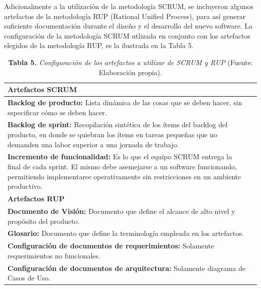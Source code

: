 Adicionalmente a la utilizaci\'{o}n de la metodolog\'{i}a SCRUM, se incluyeron algunos
artefactos de la metodolog\'{i}a RUP (Rational Unified Process), para as\'{i} generar suficiente documentaci\'{o}n durante el dise\~{n}o y el desarrollo del nuevo software. La configuraci\'{o}n
 de la metodolog\'{i}a SCRUM utlizada en conjunto con los artefactos elegidos de la
 metodolog\'{i}a RUP, es la ilustrada en la Tabla 5.

			\begin{table}[htb]
				\small
				\centering
				\setlength{\extrarowheight}{5pt}
			\begin{tabulary}{15cm}{|L|L|}
				\hline
				\textbf{Artefactos SCRUM}\\ \hline
				\textbf{Backlog de producto: }Lista din\'{a}mica de las cosas que se deben hacer, sin especificar c\'{o}mo se deben hacer.\\ \hline
				\textbf{Backlog de sprint: }Recopilaci\'{o}n sint\'{e}tica de los \'{i}tems del backlog del producto, en donde se quiebran los \'{i}tems en tareas peque\~{n}as que no demanden una labor superior a una jornada de trabajo.\\ \hline
				\textbf{Incremento de funcionalidad: }Es lo que el equipo SCRUM entrega la final de cada sprint. El mismo debe asemejarse a un software funcionando, permitiendo implementarse operativamente sin restricciones en un ambiente productivo.\\ \hline
				\textbf{Artefactos RUP}\\ \hline
				\textbf{Documento de Visi\'{o}n: }Documento que define el alcance de alto nivel y prop\'{o}sito del producto.\\
\hline
				\textbf{Glosario: }Documento que define la terminolog\'{i}a empleada en los artefactos.\\ \hline
				\textbf{Configuraci\'{o}n de documentos de requerimientos:} Solamente requerimientos no funcionales.\\ \hline
		\textbf{Configuraci\'{o}n de documentos de arquitectura: } Solamente diagrama de Casos de Uso.\\ \hline
			\end{tabulary}
	\caption{\textbf{Tabla 5.} \textit{Configuraci\'{o}n de los artefactos a utilizar de SCRUM y RUP} (Fuente: Elaboraci\'{o}n propia).}
			\end{table}
